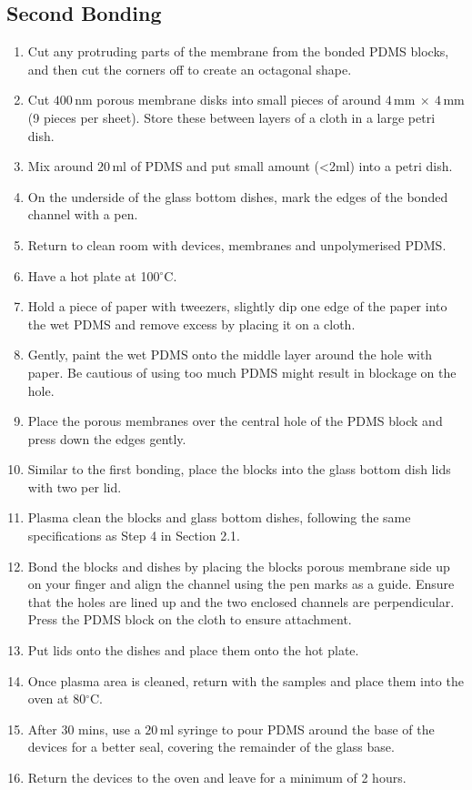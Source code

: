 \subsection{Second Bonding}

\begin{enumerate}
 \setlength\itemsep{-0.1em}
	\item Cut any protruding parts of the membrane from the bonded PDMS blocks, and then cut the corners off to create an octagonal shape.
	\item Cut $400 \, \text{nm}$ porous membrane disks into small pieces of around $4 \, \text{mm} \: \times \: 4 \, \text{mm}$ (9 pieces per sheet). Store these between layers of a cloth in a large petri dish.
	\item Mix around $20 \, \text{ml}$ of PDMS and put small amount (<2ml) into a petri dish.
	\item On the underside of the glass bottom dishes, mark the edges of the bonded channel with a pen.
	\item Return to clean room with devices, membranes and unpolymerised PDMS.
	\item Have a hot plate at 100$^{\circ}$C.
	\item Hold a piece of paper with tweezers, slightly dip one edge of the paper into the wet PDMS and remove excess by placing it on a cloth. 
	\item Gently, paint the wet PDMS onto the middle layer around the hole with paper. Be cautious of using too much PDMS might result in blockage on the hole.
	\item Place the porous membranes over the central hole of the PDMS block and press down the edges gently. 
	\item Similar to the first bonding, place the blocks into the glass bottom dish lids with two per lid. 
	\item Plasma clean the blocks and glass bottom dishes, following the same specifications as Step 4 in Section 2.1.
	\item Bond the blocks and dishes by placing the blocks porous membrane side up on your finger and align the channel using the pen marks as a guide. Ensure that the holes are lined up and the two enclosed channels are perpendicular. Press the PDMS block on the cloth to ensure attachment. 
	\item Put lids onto the dishes and place them onto the hot plate.
	\item Once plasma area is cleaned, return with the samples and place them into the oven at 80$^{\circ}$C. 
	\item After 30 mins, use a $20 \, \text{ml}$ syringe to pour PDMS around the base of the devices for a better seal, covering the remainder of the glass base.
	\item Return the devices to the oven and leave for a minimum of 2 hours.
\end{enumerate}


